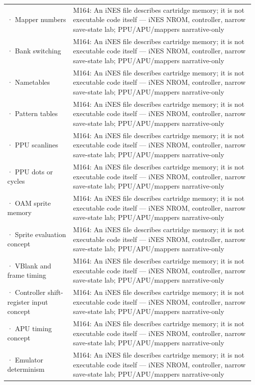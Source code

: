 {\begin{longtable}[]{@{}
  >{\raggedright\arraybackslash}p{}
  >{\raggedright\arraybackslash}p{}@{}}
2732 · Mapper numbers & M164: An iNES file describes cartridge memory; it is not executable code itself --- iNES NROM, controller, narrow save-state lab; PPU/APU/mappers narrative-only \\
2733 · Bank switching & M164: An iNES file describes cartridge memory; it is not executable code itself --- iNES NROM, controller, narrow save-state lab; PPU/APU/mappers narrative-only \\
2734 · Nametables & M164: An iNES file describes cartridge memory; it is not executable code itself --- iNES NROM, controller, narrow save-state lab; PPU/APU/mappers narrative-only \\
2735 · Pattern tables & M164: An iNES file describes cartridge memory; it is not executable code itself --- iNES NROM, controller, narrow save-state lab; PPU/APU/mappers narrative-only \\
2736 · PPU scanlines & M164: An iNES file describes cartridge memory; it is not executable code itself --- iNES NROM, controller, narrow save-state lab; PPU/APU/mappers narrative-only \\
2737 · PPU dots or cycles & M164: An iNES file describes cartridge memory; it is not executable code itself --- iNES NROM, controller, narrow save-state lab; PPU/APU/mappers narrative-only \\
2738 · OAM sprite memory & M164: An iNES file describes cartridge memory; it is not executable code itself --- iNES NROM, controller, narrow save-state lab; PPU/APU/mappers narrative-only \\
2739 · Sprite evaluation concept & M164: An iNES file describes cartridge memory; it is not executable code itself --- iNES NROM, controller, narrow save-state lab; PPU/APU/mappers narrative-only \\
2740 · VBlank and frame timing & M164: An iNES file describes cartridge memory; it is not executable code itself --- iNES NROM, controller, narrow save-state lab; PPU/APU/mappers narrative-only \\
2741 · Controller shift-register input concept & M164: An iNES file describes cartridge memory; it is not executable code itself --- iNES NROM, controller, narrow save-state lab; PPU/APU/mappers narrative-only \\
2742 · APU timing concept & M164: An iNES file describes cartridge memory; it is not executable code itself --- iNES NROM, controller, narrow save-state lab; PPU/APU/mappers narrative-only \\
2743 · Emulator determinism & M164: An iNES file describes cartridge memory; it is not executable code itself --- iNES NROM, controller, narrow save-state lab; PPU/APU/mappers narrative-only \\

\end{longtable}}
